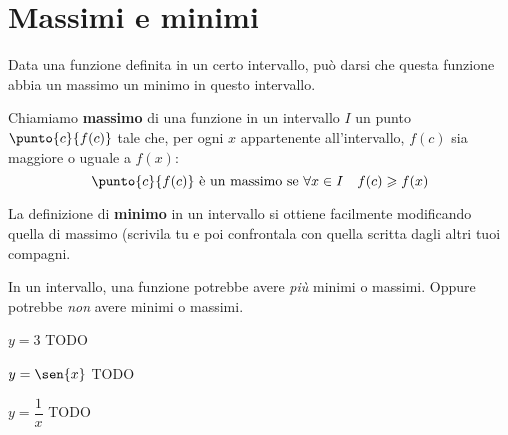 \begin{comment}
\end{esempio}

\begin{teorema}[Funzioni di funzioni]
Se \(f(x)\) e \(g(x)\) sono funzioni continue, anche \(f(g(x))\) è continua.
\end{teorema}

\noindent Ipotesi: 
\(f(x) \text{ e} g(x)\) sono continue
\tab Tesi: 
\(f(x) \star g(x) = f(g(x))\) è continua.

\begin{proof}
Dato che \(g\) è continua: 
\[f(g(x+\epsilon)) = f(g(x)+\alpha)\]
e dato che \(f\) è continua: 
\[f(g(x)+\alpha)=f(g(x))+\beta\]
quindi: 
\[f(g(x+\epsilon)) = f(g(x)+\alpha) = f(g(x))+\beta \approx f(g(x))\]
\end{proof}

\end{comment}

\section{Massimi e minimi}
\label{sec:cont_massimiminimi}

Data una funzione definita in un certo intervallo, può darsi che questa 
funzione abbia un massimo  un minimo in questo intervallo.

\begin{definizione}
 Chiamiamo \textbf{massimo} di una funzione in un intervallo \(I\) un punto 
\(\punto{c}{f(c)}\) tale che, per ogni \(x\) appartenente all'intervallo, 
\(f(c)\) sia maggiore o uguale a \(f(x)\):
\[\punto{c}{f(c)} \text{ è un massimo se } \forall x \in I \quad
f(c) \geqslant f(x)\]
\end{definizione}

La definizione di \textbf{minimo} in un intervallo si ottiene facilmente 
modificando quella di massimo (scrivila tu e poi confrontala con quella scritta 
dagli altri tuoi compagni.

In un intervallo, una funzione potrebbe avere \emph{più} minimi o massimi. 
Oppure potrebbe \emph{non} avere minimi o massimi.

\begin{esempio}
 \(y=3\) TODO
\end{esempio}

\begin{esempio}
 \(y=\sen{x}\) TODO
\end{esempio}

\begin{esempio}
 \(y=\dfrac{1}{x}\) TODO
\end{esempio}

